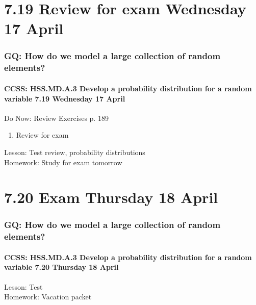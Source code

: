 \documentclass{beamer}
\begin{document}
  \section{7.19 Review for exam Wednesday 17 April}
    \frame
    {
      \frametitle{GQ: How do we model a large collection of random elements?}
      \framesubtitle{CCSS: HSS.MD.A.3 Develop a probability distribution for a random variable \hfill \alert{7.19 Wednesday 17 April}}

      \begin{block}{Do Now: Review Exercises p. 189}
        \begin{enumerate}
          \item Review for exam
      \end{enumerate}
      \end{block}
      Lesson: Test review, probability distributions\\[1cm]
      Homework: Study for \alert{exam tomorrow}
    }

  \section{7.20 Exam Thursday 18 April}
    \frame
    {
      \frametitle{GQ: How do we model a large collection of random elements?}
      \framesubtitle{CCSS: HSS.MD.A.3 Develop a probability distribution for a random variable \hfill \alert{7.20 Thursday 18 April}}

      Lesson: Test \\[1cm]
      Homework: Vacation packet
    }
\end{document}
